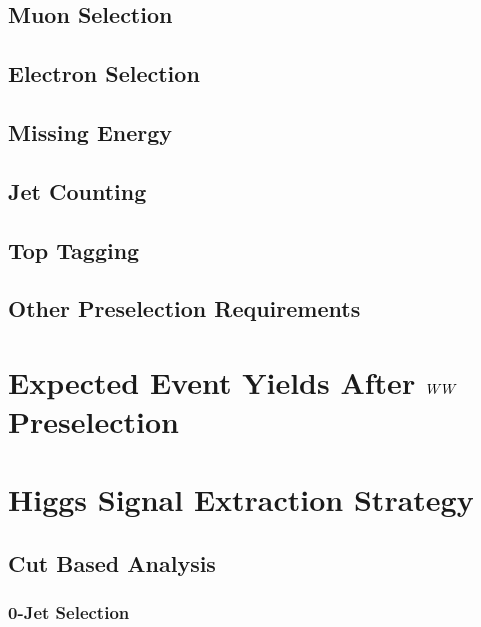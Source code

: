 \documentclass{cmspaper}
\begin{document}
  \subsection{Muon Selection} 
%   
  \subsection{Electron Selection} 
    \label{sec:sel_electrons}
%    
  \subsection{Missing Energy} 
%    
  \subsection{Jet Counting} 
%    
  \subsection{Top Tagging}
%    
  \subsection{Other Preselection Requirements}
%    

\section{Expected Event Yields After $WW$ Preselection}
%  

\clearpage    
\section{Higgs Signal Extraction Strategy}
%  
  \subsection{Cut Based Analysis}
    \subsubsection{0-Jet Selection}
%      
\end{document}
